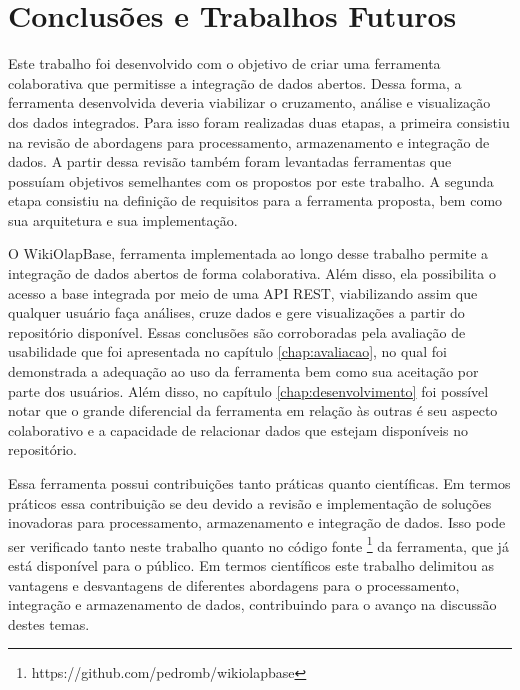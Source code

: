 
\chapter{Conclusões e Trabalhos Futuros}
\label{chap:conclusao}

Este trabalho foi desenvolvido com o objetivo de criar uma ferramenta colaborativa que permitisse
a integração de dados abertos. Dessa forma, a ferramenta desenvolvida deveria viabilizar o
cruzamento, análise e visualização dos dados integrados. Para isso foram realizadas duas etapas,
a primeira consistiu na revisão de abordagens para processamento, armazenamento e integração
de dados. A partir dessa revisão também foram levantadas ferramentas que possuíam objetivos 
semelhantes com os propostos por este trabalho. A segunda etapa consistiu na definição de 
requisitos para a ferramenta proposta, bem como sua arquitetura e sua implementação.

O WikiOlapBase, ferramenta implementada ao longo desse trabalho permite a integração de dados
abertos de forma colaborativa. Além disso, ela possibilita o acesso a base integrada por 
meio de uma API REST, viabilizando assim que qualquer usuário faça análises, cruze
dados e gere visualizações a partir do repositório disponível. Essas conclusões são corroboradas
pela avaliação de usabilidade que foi apresentada no capítulo \ref{chap:avaliacao}, no qual 
foi demonstrada a adequação ao uso da ferramenta bem como sua aceitação por parte dos usuários.
Além disso, no capítulo \ref{chap:desenvolvimento} foi possível notar que o grande diferencial da
ferramenta em relação às outras é seu aspecto colaborativo e a capacidade de relacionar dados
que estejam disponíveis no repositório.

Essa ferramenta possui contribuições tanto práticas quanto científicas. Em termos práticos essa 
contribuição se deu devido a revisão e implementação de soluções inovadoras para processamento,
armazenamento e integração de dados. Isso pode ser verificado tanto neste trabalho quanto no
código fonte \footnote{https://github.com/pedromb/wikiolapbase} da ferramenta, que já está disponível para o público. Em termos científicos este
trabalho delimitou as vantagens e desvantagens de diferentes abordagens para o processamento, 
integração e armazenamento de dados, contribuindo para o avanço na discussão destes temas.

